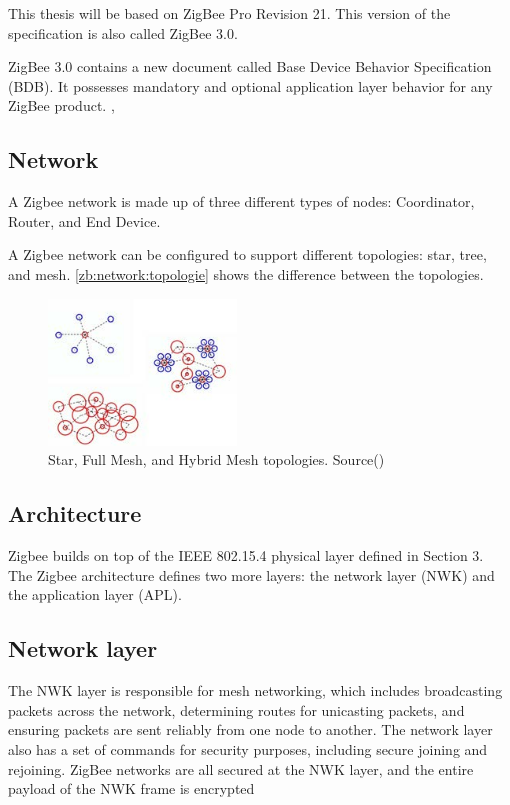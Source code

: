 This thesis will be based on ZigBee Pro Revision 21. This version of the specification is also called ZigBee 3.0.

ZigBee 3.0 contains a new document called Base Device Behavior Specification (BDB).
It possesses mandatory and optional application layer behavior for any ZigBee product. \cite{ti:new:19}, \cite{Morgner:2017}

\subsection{Network}
\label{zb:net:intro}

A Zigbee network is made up of three different types of nodes: Coordinator, Router, and End Device. \cite{Whitehurst:14}

A Zigbee network can be configured to support different topologies: star, tree, and mesh. \autoref{zb:network:topologie} shows the difference between the topologies.

\begin{figure}[!ht]
    \centering
    \includegraphics[width=50mm, keepaspectratio]{figures/zigbee-topology-ug103-02-fundamentals-zigbee.jpg}
    \caption{Star, Full Mesh, and Hybrid Mesh topologies. Source(\cite{zigbee:silabs:ug103:2})}
    \label{zb:network:topologie}
\end{figure}

\subsection{Architecture}

Zigbee builds on top of the IEEE 802.15.4 physical layer defined in Section 3. The Zigbee architecture defines two more layers: the network layer (NWK) and the application layer (APL).

\subsection{Network layer}

The NWK layer is responsible for mesh networking, which includes broadcasting packets across the network, determining routes for unicasting packets, and ensuring packets are sent reliably from one node to another. The network layer also has a set of commands for security purposes, including secure joining and rejoining. ZigBee networks are all secured at the NWK layer, and the entire payload of the NWK frame is encrypted

